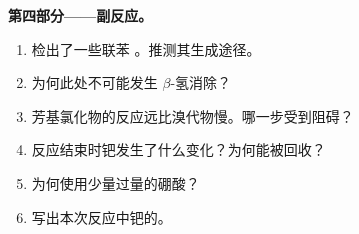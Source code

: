 \begin{problem}
\medskip
\noindent\textbf{第四部分——副反应。}
\begin{enumerate}[resume]
  \item 检出了一些联苯 。推测其生成途径。
  \item 为何此处不可能发生 $\beta$-氢消除？
  \item 芳基氯化物的反应远比溴代物慢。哪一步受到阻碍？
  \item 反应结束时钯发生了什么变化？为何能被回收？
  \item 为何使用少量过量的硼酸？
  \item 写出本次反应中钯的。
\end{enumerate}
\end{problem}

